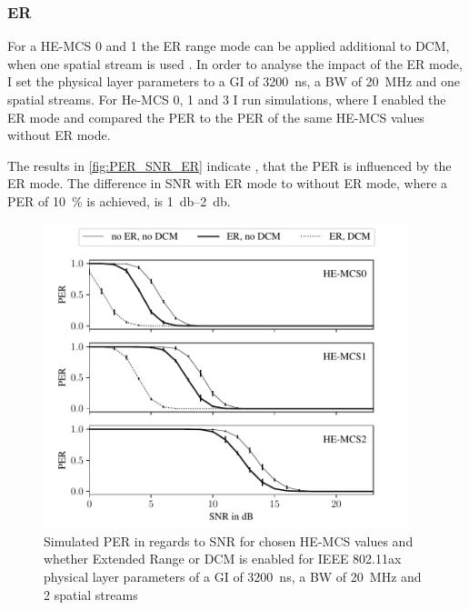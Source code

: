 \subsubsection*{\acf{ER}}
For a HE-MCS \num{0} and \num{1} the \ac{ER} range mode can be applied additional to \ac{DCM}, when one spatial stream is used \cite{noauthor_ieee_2021}.
In order to analyse the impact of the \ac{ER} mode, I set the physical layer parameters to a \ac{GI} of
\SI{3200}{\nano\second}, a \ac{BW} of \SI{20}{\mega\hertz} and one spatial streams. For He-MCS \num{0}, \num{1} and \num{3} I run simulations, where I enabled the
\ac{ER} mode and compared the \ac{PER} to the \ac{PER} of the same HE-MCS values without \ac{ER} mode.

The results in \autoref{fig:PER_SNR_ER} indicate , that the \ac{PER} is influenced by the \ac{ER} mode.
The difference in \ac{SNR} with \ac{ER} mode to without \ac{ER} mode, where a \ac{PER}
of \SI{10}{\percent} is achieved, is \SIrange{1}{2}{\decibel}.

\begin{figure}%
	\centering
	\includegraphics[width=0.95\textwidth]{figures/ER_PER_to_SNR.pdf}
	\caption{Simulated \ac{PER} in regards to \ac{SNR} for chosen HE-\ac{MCS} values and whether Extended Range or \ac{DCM}
	is enabled for IEEE 802.11ax physical layer parameters of a \ac{GI} of \SI{3200}{\nano\second}, a \ac{BW} of \SI{20}{\mega\hertz} and 2 spatial streams}
	\label{fig:PER_SNR_ER}%
\end{figure}


